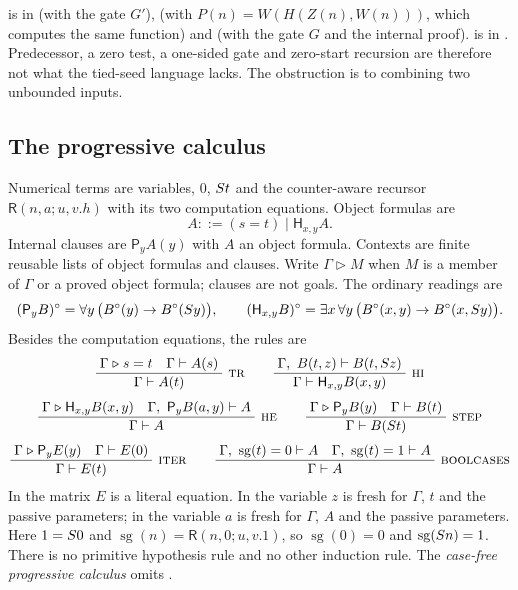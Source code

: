 \begin{remark}
 is in  (with the gate $G'$),
 (with $P(n)=W(H(Z(n),W(n)))$, which computes the same function)
and  (with the gate $G$ and the internal proof).
 is in . Predecessor, a zero test, a
one-sided gate and zero-start recursion are therefore not what the tied-seed
language lacks. The obstruction is to combining two unbounded inputs.
\end{remark}

\subsection{The progressive calculus}
\label{obs:sec:Hrules}

\begin{definition}
\label{obs:def:progressive}
Numerical terms are variables, $0$, $S t$ and the counter-aware recursor
$\mathsf{R}(n,a;u,v.h)$ with its two computation equations. Object formulas are
\[
A::=(s=t)\mid\mathsf{H}_{x,y}A .
\]
Internal clauses are $\mathsf{P}_{y}A(y)$ with $A$ an object formula. Contexts
are finite reusable lists of object formulas and clauses. Write
$\Gamma\mathrel{\triangleright}M$ when $M$ is a member of $\Gamma$ or a proved
object formula; clauses are not goals. The ordinary readings are
\[
(\mathsf{P}_{y}B)^{\circ}=\forall y\,\bigl(B^{\circ}(y)\to B^{\circ}(S y)\bigr),
\qquad
(\mathsf{H}_{x,y}B)^{\circ}=\exists x\,\forall y\,\bigl(B^{\circ}(x,y)\to B^{\circ}(x,S y)\bigr).
\]
Besides the computation equations, the rules are
\begin{gather*}
\infrule{\Gamma\mathrel{\triangleright}s=t\quad\Gamma\proves A(s)}{\Gamma\proves A(t)}\ \rulename{Tr}
\qquad
\infrule{\Gamma,\ B(t,z)\proves B(t,\Suc z)}{\Gamma\proves\mathsf{H}_{x,y}B(x,y)}\ \rulename{HI}
\\[4pt]
\infrule{\Gamma\mathrel{\triangleright}\mathsf{H}_{x,y}B(x,y)\quad\Gamma,\ \mathsf{P}_{y}B(a,y)\proves A}{\Gamma\proves A}\ \rulename{HE}
\qquad
\infrule{\Gamma\mathrel{\triangleright}\mathsf{P}_{y}B(y)\quad\Gamma\proves B(t)}{\Gamma\proves B(\Suc t)}\ \rulename{Step}
\\[4pt]
\infrule{\Gamma\mathrel{\triangleright}\mathsf{P}_{y}E(y)\quad\Gamma\proves E(0)}{\Gamma\proves E(t)}\ \rulename{Iter}
\qquad
\infrule{\Gamma,\ \operatorname{sg}(t)=0\proves A\quad\Gamma,\ \operatorname{sg}(t)=1\proves A}{\Gamma\proves A}\ \rulename{BoolCases}
\end{gather*}
In  the matrix $E$ is a literal equation. In  the
variable $z$ is fresh for $\Gamma$, $t$ and the passive parameters; in
 the variable $a$ is fresh for $\Gamma$, $A$ and the passive
parameters. Here $1=S 0$ and $\operatorname{sg}(n)=\mathsf{R}(n,0;u,v.1)$,
so $\operatorname{sg}(0)=0$ and $\operatorname{sg}(S n)=1$. There is no
primitive hypothesis rule and no other induction rule. The \emph{case-free
progressive calculus} omits .
\end{definition}

